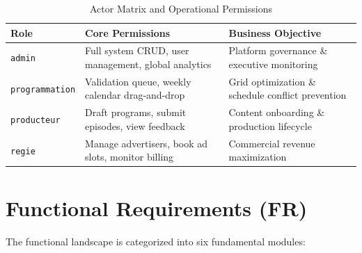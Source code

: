 \documentclass[12pt,a4paper,oneside]{report}
\begin{document}
\begin{table}[h!]
\centering
\caption{Actor Matrix and Operational Permissions}
\label{tab:actors_matrix}
\begin{tabularx}{\textwidth}{lXX}
\toprule
\textbf{Role} & \textbf{Core Permissions} & \textbf{Business Objective} \\
\midrule
\texttt{admin} & Full system CRUD, user management, global analytics & Platform governance \& executive monitoring \\
\texttt{programmation} & Validation queue, weekly calendar drag-and-drop & Grid optimization \& schedule conflict prevention \\
\texttt{producteur} & Draft programs, submit episodes, view feedback & Content onboarding \& production lifecycle \\
\texttt{regie} & Manage advertisers, book ad slots, monitor billing & Commercial revenue maximization \\
\bottomrule
\end{tabularx}
\end{table}

\section{Functional Requirements (FR)}
The functional landscape is categorized into six fundamental modules:
\end{document}
